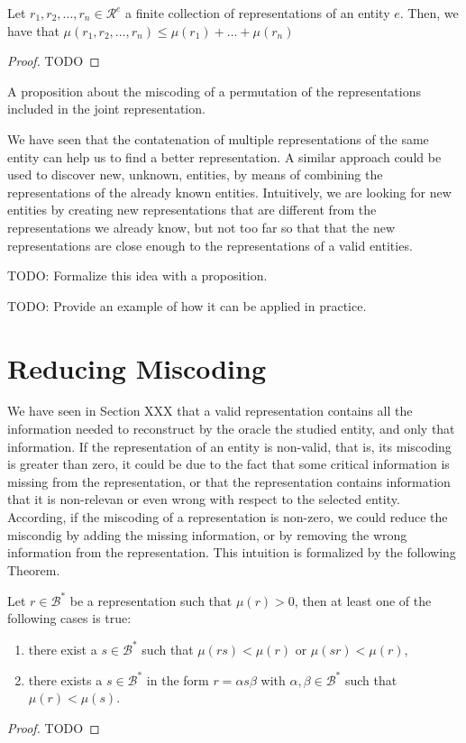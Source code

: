 \begin{proposition}
Let $r_1, r_2, \ldots, r_n \in \mathcal{R}^e$ a finite collection of representations of an entity $e$. Then, we have that $\mu(r_1, r_2, \ldots, r_n) \leq \mu(r_1) + \ldots + \mu(r_n)$
\end{proposition}
\begin{proof}
{\color{red} TODO}
\end{proof}

{\color{red} A proposition about the miscoding of a permutation of the representations included in the joint representation.}

We have seen that the contatenation of multiple representations of the same entity can help us to find a better representation. A similar approach could be used to discover new, unknown, entities, by means of combining the representations of the already known entities. Intuitively, we are looking for new entities by creating new representations that are different from the representations we already know, but not too far so that that the new representations are close enough to the representations of a valid entities.

{\color{red} TODO: Formalize this idea with a proposition.}

{\color{red} TODO: Provide an example of how it can be applied in practice.}


%
%
\section{Reducing Miscoding}

We have seen in Section {\color{red} XXX} that a valid representation contains all the information needed to reconstruct by the oracle the studied entity, and only that information. If the representation of an entity is non-valid, that is, its miscoding is greater than zero, it could be due to the fact that some critical information is missing from the representation, or that the representation contains information that it is non-relevan or even wrong with respect to the selected entity. According, if the miscoding of a representation is non-zero, we could reduce the miscondig by adding the missing information, or by removing the wrong information from the representation. This intuition is formalized by the following Theorem.

\begin{theorem}
Let $r \in \mathcal{B}^\ast$ be a representation such that $\mu(r) >0$, then at least one of the following cases is true:
\begin{enumerate}[label=(\roman*)]
\item there exist a $s \in \mathcal{B}^\ast$ such that $\mu(rs) < \mu(r)$ or $\mu(sr) < \mu(r)$,
\item there exists a $s \in \mathcal{B}^\ast$ in the form $r = \alpha s \beta$ with $\alpha, \beta \in \mathcal{B}^\ast$ such that $\mu(r) < \mu(s)$.
\end{enumerate}
\end{theorem}
\begin{proof}
{\color{red} TODO}
\end{proof}

